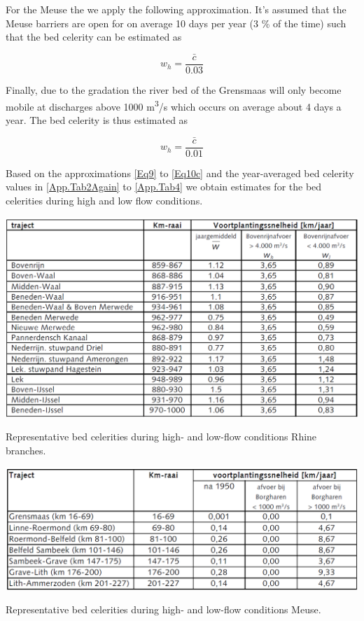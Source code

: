 For the Meuse the we apply the following approximation.
It's assumed that the Meuse barriers are open for on average 10 days per year (3 \% of the time) such that the bed celerity can be estimated as

\begin{equation}
w_h = \frac{\bar{c}}{0.03}
\label{10b}
\end{equation}


Finally, due to the gradation the river bed of the Grensmaas will only become mobile at discharges above 1000 m\textsuperscript{3}/s which occurs on average about 4 days a year.
The bed celerity is thus estimated as

\begin{equation}
w_h = \frac{\bar{c}}{0.01}
\label{Eq10c}
\end{equation}

Based on the approximations \autoref{Eq9} to \autoref{Eq10c} and the year-averaged bed celerity values in \autoref{App.Tab2Again} to \autoref{App.Tab4} we obtain estimates for the bed celerities during high and low flow conditions.

\begin{table}
\includegraphics[width=\columnwidth]{figures/Tab4_the2nd.png}
\caption{Representative bed celerities during high- and low-flow conditions Rhine branches.}
\label{App.Tab4RT}
\end{table}

\begin{table}
\includegraphics[width=\columnwidth]{figures/Tab5.png}
\caption{Representative bed celerities during high- and low-flow conditions Meuse.}
\label{App.Tab5}
\end{table}


